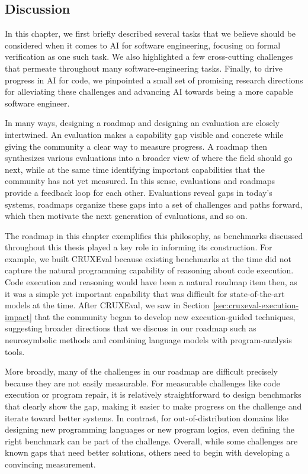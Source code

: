 \subsection{Discussion}
In this chapter, we first briefly described several tasks 
that we believe should be considered when it comes to AI for software engineering,
focusing on formal verification as one such task. 
We also highlighted a few cross-cutting challenges that permeate throughout many 
software-engineering tasks. 
Finally, to drive progress in AI for code, we pinpointed a small set of promising research directions for 
alleviating these challenges and advancing AI towards being a more capable software engineer.

In many ways, designing a roadmap and designing an evaluation are closely intertwined.
An evaluation makes a capability gap visible and concrete while giving the community a
clear way to measure progress.
A roadmap then synthesizes various evaluations into a 
broader view of where the field should go next, while at the same time 
identifying important capabilities that the community has not yet 
measured.
In this sense, evaluations and roadmaps provide a feedback loop for each other.
Evaluations reveal gaps in today's systems, roadmaps organize these gaps into 
a set of challenges and paths forward, which then motivate the next generation of
evaluations, and so on.

The roadmap in this chapter exemplifies this philosophy, as benchmarks discussed throughout this thesis played a key role in informing its construction.
For example, we built CRUXEval because existing benchmarks at the time did not capture
the natural programming capability of reasoning about code execution. Code execution and reasoning would 
have been a natural roadmap item then, as it was a simple yet important capability that was difficult for state-of-the-art models at the time. After CRUXEval, we saw in Section~\ref{sec:cruxeval-execution-impact} 
that the community began to develop new execution-guided techniques, suggesting 
broader directions that we discuss in our roadmap such as neurosymbolic methods and combining language
models with program-analysis tools.

More broadly, many of the challenges in our roadmap are difficult precisely because they
are not easily measurable. For measurable challenges like code execution or program repair,
it is relatively straightforward to design benchmarks that clearly show the gap, making 
it easier to make progress on the challenge and iterate toward better systems. In contrast, for
out-of-distribution domains like designing new programming languages or new program logics,
even defining the right benchmark can be part of the challenge. Overall, while some challenges are
known gaps that need better solutions, others need to begin with developing a convincing measurement.

